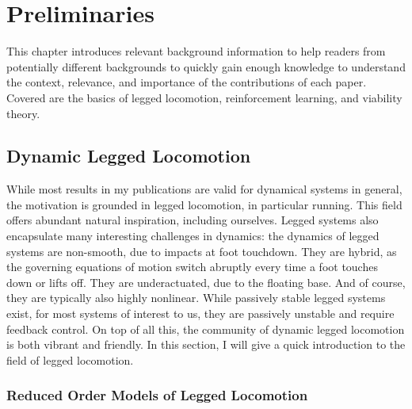
\chapter{Preliminaries} \label{chap:prelims}
This chapter introduces relevant background information to help readers from potentially different backgrounds to quickly gain enough knowledge to understand the context, relevance, and importance of the contributions of each paper. Covered are the basics of legged locomotion, reinforcement learning, and viability theory.

\section{Dynamic Legged Locomotion}
While most results in my publications are valid for dynamical systems in general, the motivation is grounded in legged locomotion, in particular running. This field offers abundant natural inspiration, including ourselves. Legged systems also encapsulate many interesting challenges in dynamics: the dynamics of legged systems are non-smooth, due to impacts at foot touchdown. They are hybrid, as the governing equations of motion switch abruptly every time a foot touches down or lifts off. They are underactuated, due to the floating base. And of course, they are typically also highly nonlinear. While passively stable legged systems exist, for most systems of interest to us, they are passively unstable and require feedback control.
On top of all this, the community of dynamic legged locomotion is both vibrant and friendly. In this section, I will give a quick introduction to the field of legged locomotion.

\subsection{Reduced Order Models of Legged Locomotion}

